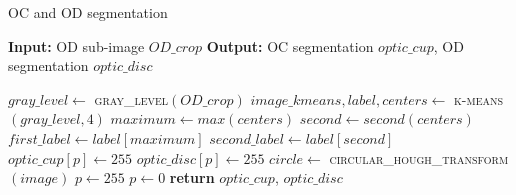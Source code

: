 \begin{algorithm}[h]
	
	\caption{OC and OD segmentation}
	\label{alg:ocodsegmentation}
	{\fontsize{10}{9}\selectfont
	\begin{algorithmic}[1]
		
		\State \textbf{Input:} OD sub-image $OD\_crop$
		\State \textbf{Output:} OC segmentation $optic\_cup$, OD segmentation $optic\_disc$
		\medbreak
		
		\State $gray\_level \gets$ \textsc{gray\_level}$(OD\_crop)$
		\State $image\_kmeans, label, centers \gets$ \textsc{k-means}$(gray\_level, 4)$ \label{kmeansoperation}
		\State $maximum \gets max(centers)$
		\State $second \gets second(centers)$
		\State $first\_label \gets label[maximum]$
		\State $second\_label \gets label[second]$
		\medbreak
				\State $optic\_cup[p] \gets 255$
				\State $optic\_disc[p] \gets 255$
			\EndIf
		\EndFor
		\medbreak
			\State $circle \gets$ \textsc{circular\_hough\_transform}$(image)$ \label{houghoperation}
					\State $p \gets 255$
					\State $p \gets 0$
				\EndIf
			\EndFor
		\EndFor
		\medbreak
		\State \textbf{return} $optic\_cup$, $optic\_disc$
		\EndFunction
		
	\end{algorithmic}
	}
\end{algorithm}